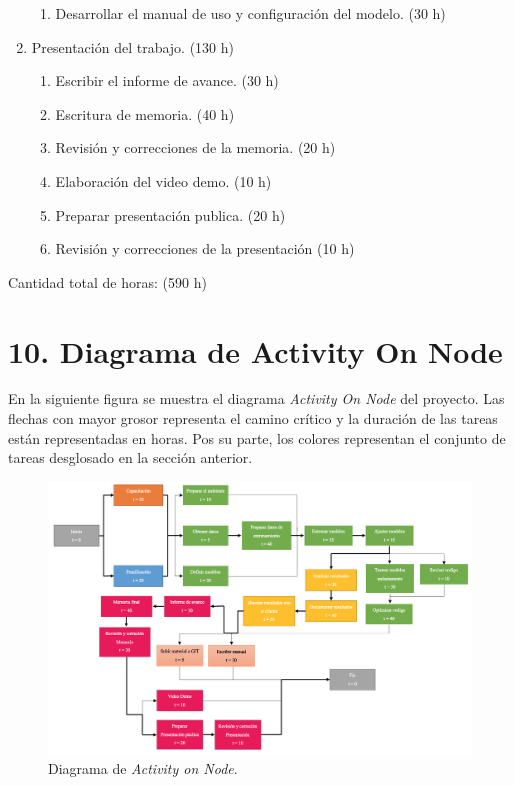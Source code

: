 \documentclass[
11pt, %
codirector, %
]{charter}
\begin{document}
\begin{enumerate}
\begin{enumerate}
		\item Desarrollar el manual de uso y configuración del modelo. (30 h)
	\end{enumerate}
\item Presentación del trabajo. (130 h)
	\begin{enumerate}
		\item Escribir el informe de avance. (30 h)
		\item Escritura de memoria. (40 h)
		\item Revisión y correcciones de la memoria. (20 h)
		\item Elaboración del video demo. (10 h)
		\item Preparar presentación publica. (20 h)
		\item Revisión y correcciones de la presentación (10 h)
	\end{enumerate}
\end{enumerate}

Cantidad total de horas: (590 h)



\section{10. Diagrama de Activity On Node}
\label{sec:AoN}

En la siguiente figura se muestra el diagrama \textit{Activity On Node}
del proyecto. Las flechas con mayor grosor representa el camino
crítico y la duración de las tareas están representadas en horas. Pos su
parte, los colores representan el conjunto de tareas desglosado en la sección
anterior.


\begin{figure}[htpb]
\centering 
\includegraphics[width=.9\textwidth]{./Figuras/Diagrama AonNode.png}
\caption{Diagrama de \textit{Activity on Node}.}
\label{fig:AoN}
\end{figure}
\end{document}
